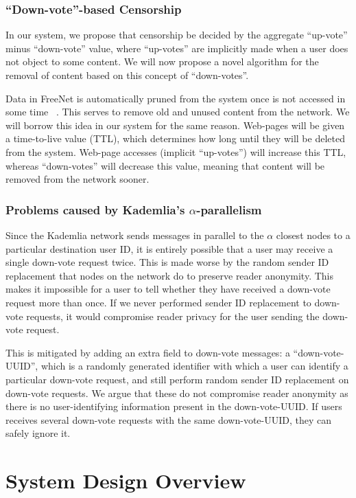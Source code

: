 \subsubsection{``Down-vote''-based Censorship}

In our system, we propose that censorship be decided by the aggregate ``up-vote'' minus ``down-vote'' value,
where ``up-votes'' are implicitly made when a user does not object to some content.
We will now propose a novel algorithm for the removal of content based on this concept of ``down-votes''.

Data in FreeNet is automatically pruned from the system once is not accessed in some time ~\cite{freenet}.
This serves to remove old and unused content from the network. We will borrow this idea in our system for
the same reason. Web-pages will be given a time-to-live value (TTL), which determines how long until they will
be deleted from the system. Web-page accesses (implicit ``up-votes'') will increase this
TTL, whereas ``down-votes'' will decrease this value, meaning that content will be removed from the network sooner.

\subsubsection{Problems caused by Kademlia's $\alpha$-parallelism}

Since the Kademlia network sends messages in parallel to the $\alpha$ closest nodes to a particular destination user ID,
it is entirely possible that a user may receive a single down-vote request twice. This is made worse by the
random sender ID replacement that nodes on the network do to preserve reader anonymity.
This makes it impossible for a user to tell whether they have received a down-vote request more than once.
If we never performed sender ID replacement to down-vote requests, it would compromise reader privacy for the user
sending the down-vote request.

This is mitigated by adding an extra field to down-vote messages: a ``down-vote-UUID'', which is a randomly generated
identifier with which a user can identify a particular down-vote request, and still perform random sender ID
replacement on down-vote requests. We argue that these do not compromise reader anonymity as there is no
user-identifying information present in the down-vote-UUID. If users receives several down-vote requests
with the same down-vote-UUID, they can safely ignore it.

\section{System Design Overview}

